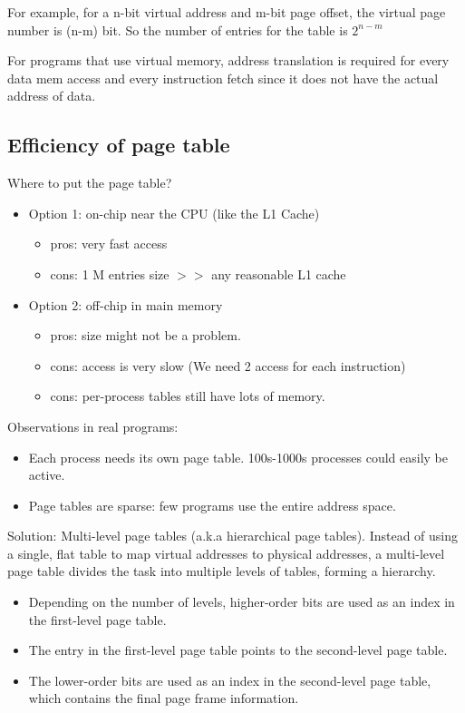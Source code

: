 \documentclass[letterpaper,12pt]{article}
\begin{document}
For example, for a n-bit virtual address and m-bit page offset, the virtual page number is (n-m) bit. So the number of entries for the table is $2^{n-m}$

For programs that use virtual memory, address translation is required for every data mem access and every instruction fetch since it does not have the actual address of data.

\subsection{Efficiency of page table}

Where to put the page table?
\begin{itemize}
    \item Option 1: on-chip near the CPU (like the L1 Cache)
          \begin{itemize}
              \item pros: very fast access
              \item cons: 1 M entries size $>>$ any reasonable L1 cache
          \end{itemize}
    \item Option 2: off-chip in main memory
          \begin{itemize}
              \item pros: size might not be a problem.
              \item cons: access is very slow (We need 2 access for each instruction)
              \item cons: per-process tables still have lots of memory.
          \end{itemize}
\end{itemize}

Observations in real programs:
\begin{itemize}
    \item Each process needs its own page table. 100s-1000s processes could easily be active.
    \item Page tables are sparse: few programs use the entire address space.
\end{itemize}

Solution: Multi-level page tables (a.k.a hierarchical page tables). Instead of using a single, flat table to map virtual addresses to physical addresses, a multi-level page table divides the task into multiple levels of tables, forming a hierarchy.

\begin{itemize}
    \item Depending on the number of levels, higher-order bits are used as an index in the first-level page table.
    \item The entry in the first-level page table points to the second-level page table.
    \item The lower-order bits are used as an index in the second-level page table, which contains the final page frame information.
\end{itemize}
\end{document}

